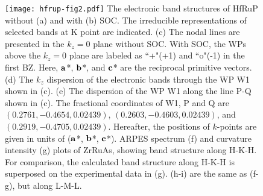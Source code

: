 \begin{figure}[!htbp]
\centering
\texttt{[image: hfrup-fig2.pdf]}
        {
        The electronic band structures of HfRuP without (a) and with (b) SOC.
        The irreducible representations of selected bands at K point are indicated.
        (c) The nodal lines are presented in the $k_z=0$ plane without SOC.
        With SOC, the WPs above the $k_z=0$ plane are labeled as ``+"(+1) and ``o"(-1) in the first BZ.
        Here, $\bf a$*, $\bf b$*, and $\bf c$* are the reciprocal primitive vectors.
        (d) The $k_z$ dispersion of the electronic bands through the WP W1 shown in (c).
        (e) The dispersion of the WP W1 along the line P-Q shown in (c).
        The fractional coordinates of W1, P and Q are $(0.2761 , -0.4654, 0.02439)$, $(0.2603 , -0.4603, 0.02439)$, and $(0.2919 , -0.4705, 0.02439)$. Hereafter, the positions of $k$-points are given in units of ($\bf a$*, $\bf b$*, $\bf c$*).
        ARPES spectrum (f) and curvature intensity (g) plots of ZrRuAs, showing band structure along H-K-H. For comparison, the calculated band structure along H-K-H is superposed on the experimental data in (g). (h-i) are the same as (f-g), but along L-M-L. ~\citep{qian2019npj}}
\label{fig:4-2}
\end{figure}
    

